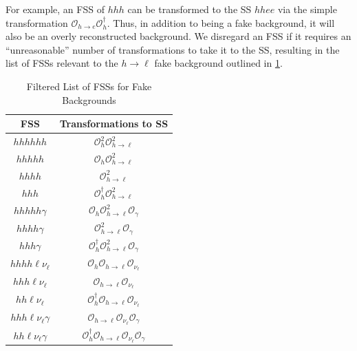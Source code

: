 For example, an FSS of $hhh$ can be transformed to the SS $hhee$ via the simple transformation $\mathcal{O}_{h\to e}\mathcal{O}^\dagger_h$. %
Thus, in addition to being a fake background, it will also be an overly reconstructed background. %
We disregard an FSS if it requires an ``unreasonable'' number of transformations to take it to the SS, resulting in the list of FSSs relevant to the $h\to\ell$ fake background outlined in \ref{tab:potential-fake-fss}. %
\begin{table}[!ht]
    \centering
    \begin{tabular}{||c|c||}
        \hline
        \textbf{FSS} & \textbf{Transformations to SS} \\
        \hline 
        $hhhhhh$ & $\mathcal{O}^2_h\mathcal{O}^2_{h\to\ell}$ \\
        $hhhhh$ & $\mathcal{O}_h\mathcal{O}^2_{h\to\ell}$ \\
        $hhhh$ & $\mathcal{O}^2_{h\to\ell}$ \\
        $hhh$ & $\mathcal{O}^\dagger_h \mathcal{O}^2_{h\to\ell}$ \\
        $hhhhh\gamma$ & $\mathcal{O}_h\mathcal{O}^2_{h\to\ell}\mathcal{O}_{\gamma}$ \\
        $hhhh\gamma$ & $\mathcal{O}^2_{h\to\ell}\mathcal{O}_{\gamma}$ \\
        $hhh\gamma$ & $\mathcal{O}^\dagger_h \mathcal{O}^2_{h\to\ell}\mathcal{O}_{\gamma}$ \\
        $hhhh\ell\nu_{\ell}$ & $\mathcal{O}_h\mathcal{O}_{h\to\ell}\mathcal{O}_{\nu_{\ell}}$ \\
        $hhh\ell\nu_{\ell}$ & $\mathcal{O}_{h\to\ell}\mathcal{O}_{\nu_{\ell}}$ \\
        $hh\ell\nu_{\ell}$ & $\mathcal{O}^\dagger_h \mathcal{O}_{h\to\ell}\mathcal{O}_{\nu_{\ell}}$ \\
        $hhh\ell\nu_{\ell}\gamma$ & $\mathcal{O}_{h\to\ell}\mathcal{O}_{\nu_{\ell}}\mathcal{O}_{\gamma}$ \\
        $hh\ell\nu_{\ell}\gamma$ & $\mathcal{O}^\dagger_h \mathcal{O}_{h\to\ell}\mathcal{O}_{\nu_{\ell}}\mathcal{O}_{\gamma}$ \\
        \hline
    \end{tabular}
    \caption{Filtered List of FSSs for Fake Backgrounds}
    \label{tab:potential-fake-fss}
\end{table}
